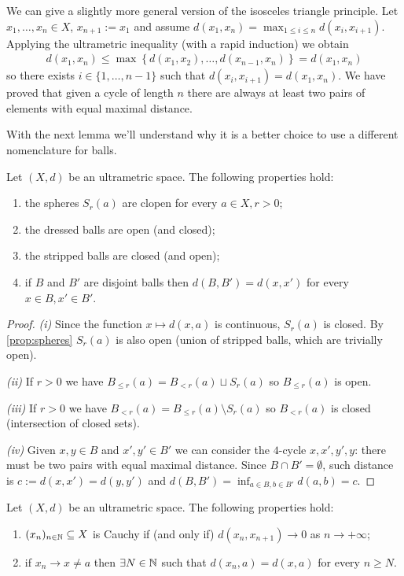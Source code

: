 		We can give a slightly more general version of the isosceles triangle principle. Let $x_1, \dots,x_n \in X$, $x_{n+1} := x_1$ and assume $d(x_1, x_n) = \max_{1 \leq i \leq n} d(x_i, x_{i+1})$. Applying the ultrametric inequality (with a rapid induction) we obtain
		\begin{gather*}
			d(x_1, x_n) \leq \max \left\{d(x_1, x_2), \dots, d(x_{n-1}, x_n) \right\} = d(x_1, x_n)
		\end{gather*}
		so there exists $i \in \{1, \dots, n-1\}$ such that $d(x_i, x_{i+1}) = d(x_1, x_n)$. 
		We have proved that given a cycle of length $n$ there are always at least two pairs of elements with equal maximal distance.
		
		With the next lemma we'll understand why it is a better choice to use a different nomenclature for balls.
		\begin{prop}
			Let $(X, d)$ be an ultrametric space. The following properties hold:
			\begin{enumerate}[label=(\roman*)]
				\item the spheres $S_r(a)$ are clopen for every $a \in X, r > 0$;
				\item the dressed balls are open (and closed);
				\item the stripped balls are closed (and open);
				\item if $B$ and $B'$ are disjoint balls then $d(B, B') = d(x, x')$ for every $x \in B, x' \in B'$.
			\end{enumerate}
		\end{prop}
		\begin{proof}
			\textit{(i)} Since the function $x \mapsto d(x, a)$ is continuous, $S_r(a)$ is closed. By \cref{prop:spheres} $S_r(a)$ is also open (union of stripped balls, which are trivially open).
			
			\textit{(ii)} If $r > 0$ we have $B_{\leq r}(a) = B_{<r}(a) \sqcup S_r(a)$ so $B_{\leq r}(a)$ is open.
			
			\textit{(iii)} If $r > 0$ we have $B_{<r}(a) = B_{\leq r}(a) \setminus S_r(a)$ so $B_{<r}(a)$ is closed (intersection of closed sets).
			
			\textit{(iv)} Given $x, y \in B$ and $x', y' \in B'$ we can consider the $4$-cycle $x, x', y', y$: there must be two pairs with equal maximal distance. Since $B \cap B' = \emptyset$, such distance is $c := d(x, x') = d(y, y')$ and $d(B, B') = \inf_{a \in B, b \in B'} d(a, b) = c$.
		\end{proof}
		\begin{lemma}
			\label{lemma:cauchy-sequence-ultrametric}
			Let $(X, d)$ be an ultrametric space. The following properties hold:
			\begin{enumerate}[label=(\roman*)]
				\item $(x_n)_{n \in \mathbb{N}} \subseteq X$ is Cauchy if (and only if) $d(x_n, x_{n+1}) \to 0$ as $n \to +\infty$;
				\item if $x_n \to x \neq a$ then $\exists N \in \mathbb{N}$ such that $d(x_n, a) = d(x, a)$ for every $n \geq N$.
			\end{enumerate} 
		\end{lemma}	 
